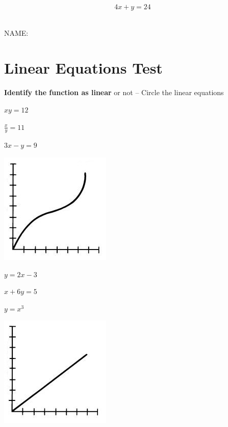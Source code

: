 \documentclass[12pt]{article}
\begin{document}
$$4x+y=24$$\\


\pagebreak

\hfill NAME:\underline{\hspace{3in}}\\

\section*{Linear Equations Test}

\textbf{Identify the function as linear} or not -- Circle the linear equations

\begin{enumerate}
\begin{multicols}{2}

\item $xy=12$ \\

\item $\frac{x}{y}=11$\\

\item $3x-y=9$\\

\item \includegraphics[scale=.5]{nonlinear.jpg}

\item $y=2x-3$\\

\item $x+6y=5$\\

\item $y=x^3$\\

\item \includegraphics[scale=.5]{linear.jpg}

\end{multicols}
\end{enumerate}
\end{document}
